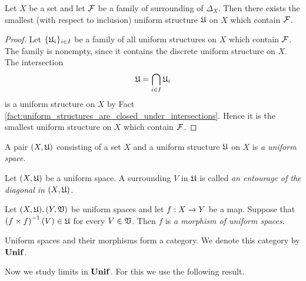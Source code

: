 \begin{corollary}\label{corollary:smallest_uniform_structure_containing_given_family_of_surroundings}
Let $X$ be a set and let ${\mathcal F}$ be a family of surrounding of $\Delta_X$. Then there exists the smallest (with respect to inclusion) uniform structure ${\mathfrak U}$ on $X$ which contain ${\mathcal F}$.
\end{corollary}
\begin{proof}
Let $\{{\mathfrak U}_i\}_{i\in I}$ be a family of all uniform structures on $X$ which contain ${\mathcal F}$. The family is nonempty, since it contains the discrete uniform structure on $X$. The intersection $${\mathfrak U} = \bigcap_{i\in I}{\mathfrak U}_i$$
is a uniform structure on $X$ by Fact \ref{fact:uniform_structures_are_closed_under_intersections}. Hence it is the smallest uniform structure on $X$ which contain ${\mathcal F}$.
\end{proof}

\begin{definition}
A pair $(X,{\mathfrak U})$ consisting of a set $X$ and a uniform structure ${\mathfrak U}$ on $X$ is \textit{a uniform space}.
\end{definition}

\begin{definition}
Let $(X,{\mathfrak U})$ be a uniform space. A surrounding $V$ in ${\mathfrak U}$ is called \textit{an entourage of the diagonal in $(X,{\mathfrak U})$}. 
\end{definition}

\begin{definition}
Let $(X,{\mathfrak U}),(Y,{\mathfrak V})$ be uniform spaces and let $f:X\rightarrow Y$ be a map. Suppose that $\left(f\times f\right)^{-1}(V) \in {\mathfrak U}$ for every $V\in {\mathfrak V}$. Then $f$ is \textit{a morphism of uniform spaces}. 
\end{definition}

\begin{remark}\label{remark:category_of_uniform_spaces}
Uniform spaces and their morphisms form a category. We denote this category by $\mathbf{Unif}$.
\end{remark}
\noindent
Now we study limits in $\mathbf{Unif}$. For this we use the following result.

